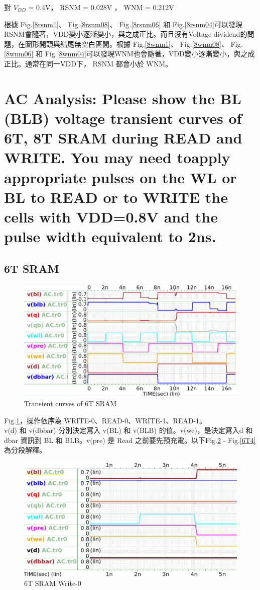 \documentclass{article}
\begin{document}
    \vspace*{-1cm}
    對 $V_{DD}$ = 0.4V， RSNM = 0.028V ， WNM = 0.212V
    
    根據 Fig.\ref{8rsnm1}、 Fig.\ref{8rsnm08}、 Fig.\ref{8rsnm06} 和 Fig.\ref{8rsnm04}可以發現RSNM會隨著，VDD變小逐漸變小，與之成正比。而且沒有Voltage dividend的問題，在圖形開頭與結尾無空白區間。根據 Fig.\ref{8wnm1}、 Fig.\ref{8wnm08}、 Fig.\ref{8wnm06} 和 Fig.\ref{8wnm04}可以發現WNM也會隨著，VDD變小逐漸變小，與之成正比。通常在同一VDD下， RSNM 都會小於 WNM。



\section{AC Analysis: Please show the BL (BLB) voltage transient curves of 6T, 8T SRAM during READ and WRITE. You may need toapply appropriate pulses on the WL or BL to READ or to WRITE the cells with VDD=0.8V and the pulse width equivalent to 2ns.}

\subsection{6T SRAM}



\begin{figure}[H]
    \centering
    \includegraphics[width=0.9\linewidth]{./img/2023-11-16-09-58-07.png}
    \caption{Transient curves of 6T SRAM}
    \label{tran6T}
    \end{figure}

Fig.\ref{tran6T}，操作依序為 WRITE-0、READ-0、WRITE-1、READ-1。\\
v(d) 和 v(dbbar) 分別決定寫入 v(BL) 和 v(BLB) 的值。v(we)，是決定寫入d 和 dbar 資訊到 BL 和 BLB。v(pre) 是 Read 之前要先預充電。以下Fig.\ref{6T1} - Fig.\ref{6T4}為分段解釋。

\begin{figure}[H]
    \centering
    \includegraphics[width=0.7\linewidth]{./img/2023-11-16-12-53-45.png}
\caption{6T SRAM Write-0}
\label{6T1}
\end{figure}
\end{document}
